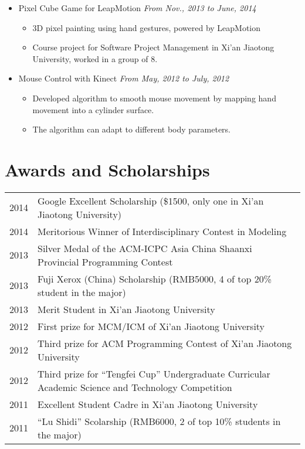 \documentclass[a4paper,11pt]{article}
\begin{document}
\begin{itemize}
    \item Pixel Cube Game for LeapMotion \hfill \textit{From Nov., 2013 to June, 2014}
    \begin{itemize}
        \item 3D pixel painting using hand gestures, powered by LeapMotion
        \item Course project for Software Project Management in Xi'an Jiaotong University, worked in a group
of 8.
    \end{itemize}

    \item Mouse Control with Kinect \hfill \textit{From May, 2012 to July, 2012}
    \begin{itemize}
        \item Developed algorithm to smooth mouse movement by mapping hand movement into a cylinder surface.
        \item The algorithm can adapt to different body parameters.
    \end{itemize}
\end{itemize}


\section{Awards and Scholarships}

\begin{tabular}{lp{15cm}}
    2014 & Google Excellent Scholarship (\$1500, only one in Xi'an Jiaotong University) \\
    2014 & Meritorious Winner of Interdisciplinary Contest in Modeling \\
    2013 & Silver Medal of the ACM-ICPC Asia China
            \newline Shaanxi Provincial Programming Contest \\
    2013 & Fuji Xerox (China) Scholarship (RMB5000, 4 of top 20\% student in the major) \\
    2013 & Merit Student in Xi'an Jiaotong University \\
    2012 & First prize for MCM/ICM of Xi'an Jiaotong University \\
    2012 & Third prize for ACM Programming Contest of Xi'an Jiaotong University \\
    2012 & Third prize for ``Tengfei Cup'' Undergraduate
            \newline Curricular Academic Science and Technology Competition \\
    2011 & Excellent Student Cadre in Xi'an Jiaotong University  \\
    2011 & ``Lu Shidi'' Scolarship (RMB6000, 2 of top 10\% students in the major)
\end{tabular}
\end{document}
